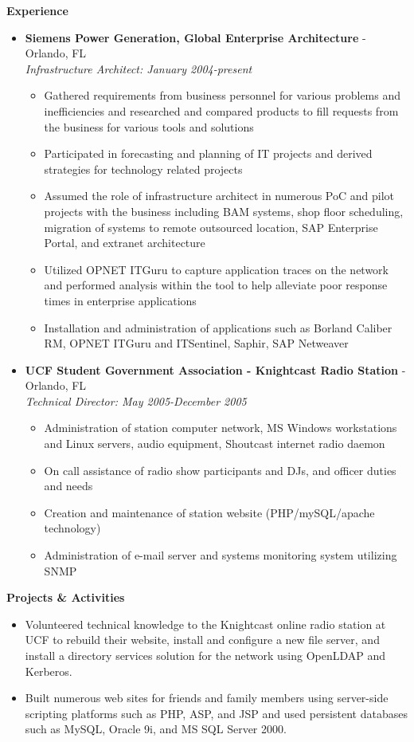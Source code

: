 \documentclass[10pt,oneside]{article}
\newenvironment{ressection}[1]{
	\vspace{4pt}
	\textbf{\selectfont\normalsize#1}
	\begin{itemize}
	\vspace{3pt}
}{
	\end{itemize}
}
\newcommand{\resitem}[1]{
	\vspace{-4pt}
	\item \begin{flushleft} #1 \end{flushleft}
}
\newcommand{\ressubitem}[1]{
	\vspace{-1pt}
	\item \begin{flushleft} #1 \end{flushleft}
}
\newcommand{\resbigitem}[3]{
	\vspace{-5pt}
	\item
	\textbf{#1} - #2 \\
	\textit{#3}
}
\newenvironment{ressubsec}[3]{
	\resbigitem{#1}{#2}{#3}
	\vspace{-2pt}
	\begin{itemize}
}{
	\end{itemize}
}
\begin{document}
\begin{ressection}{Experience}

	\begin{ressubsec}{Siemens Power Generation, Global Enterprise Architecture}{Orlando, FL}{Infrastructure Architect: January 2004-present}
		\ressubitem{Gathered requirements from business personnel for various problems and inefficiencies and researched and compared products to fill requests from the business for various tools and solutions}
		\ressubitem{Participated in forecasting and planning of IT projects and derived strategies for technology related projects}
		\ressubitem{Assumed the role of infrastructure architect in numerous PoC and pilot projects with the business including BAM systems, shop floor scheduling, migration of systems to remote outsourced location, SAP Enterprise Portal, and extranet architecture}
		\ressubitem{Utilized OPNET ITGuru to capture application traces on the network and performed analysis within the tool to help alleviate poor response times in enterprise applications}
		\ressubitem{Installation and administration of applications such as Borland Caliber RM, OPNET ITGuru and ITSentinel, Saphir, SAP Netweaver}
	\end{ressubsec}

	\begin{ressubsec}{UCF Student Government Association - Knightcast Radio Station}{Orlando, FL}{Technical Director: May 2005-December 2005}
		\ressubitem{Administration of station computer network, MS Windows workstations and Linux servers, audio equipment, Shoutcast internet radio daemon}
		\ressubitem{On call assistance of radio show participants and DJs, and officer duties and needs}
		\ressubitem{Creation and maintenance of station website (PHP/mySQL/apache technology)}
		\ressubitem{Administration of e-mail server and systems monitoring system utilizing SNMP}
	\end{ressubsec}

\end{ressection}


\begin{ressection}{Projects \& Activities}

	\resitem{Volunteered technical knowledge to the Knightcast online radio station at UCF to rebuild their website, install and configure a new file server, and install a directory services solution for the network using OpenLDAP and Kerberos.}
	\resitem{Built numerous web sites for friends and family members using server-side scripting platforms such as PHP, ASP, and JSP and used persistent databases such as MySQL, Oracle 9i, and MS SQL Server 2000.}

\end{ressection}
\end{document}

